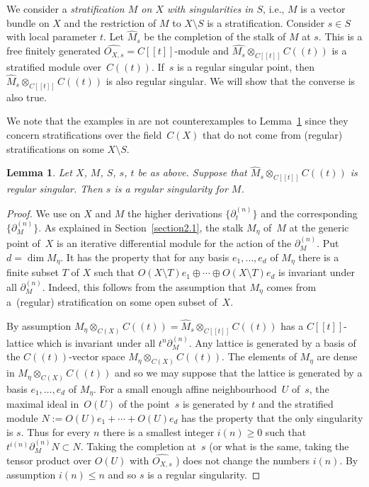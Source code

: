 \documentclass[10pt,a4paper]{amsart}
\numberwithin{equation}{section}
\newtheorem{Lemma}[Theorem]{Lemma}
\begin{document}
We consider a {\it stratification $M$ on $X$ with singularities in $S$}, i.e., $M$ is a vector bundle on $X$ and the restriction of $M$ to $X\setminus S$ is a stratification. Consider $s\in S$ with local parameter $t$. Let $\widehat{M}_s$ be the completion of the stalk of $M$ at $s$. This is a free finitely generated $\widehat{O_{X,s}}=C[[t]]$-module and $\widehat{M_s}\otimes _{C[[t]]}C((t))$ is a stratified module over~$C((t))$. If~$s$ is a regular singular point, then $\widehat{M}_s\otimes_{C[[t]]} C((t))$ is also regular singular. We will show that the converse is also true.

We note that the examples in \cite[Sections~4.2 and~7]{Ma-vdP1} are not counterexamples to Lemma~\ref{3.1} since they concern stratifications over the field~$C(X)$ that do not come from (regular) stratifications on some $X\setminus S$.

\begin{Lemma}\label{3.1} Let $X$, $M$, $S$, $s$, $t$ be as above. Suppose that $\widehat{M}_s\otimes _{C[[t]]}C((t))$ is regular singular. Then $s$ is a regular singularity for $M$.
 \end{Lemma}
\begin{proof} We use on $X$ and $M$ the higher derivations $\big\{\partial_t^{(n)}\big\}$ and the corresponding $\big\{\partial_M^{(n)}\big\}$. As explained in Section~\ref{section2.1}, the stalk $M_\eta$ of~$M$ at the generic point of~$X$ is an iterative differential module for the action of the $\partial_M^{(n)}$. Put $d=\dim M_\eta$. It has the property that for any basis $e_1,\dots ,e_d$ of $M_\eta$ there is a finite subset $T$ of $X$ such that $O(X\setminus T)e_1\oplus \cdots \oplus O(X\setminus T)e_d$ is invariant under all $\partial_M^{(n)}$. Indeed, this follows from the assumption that $M_\eta$ comes from a~(regular) stratification on some open subset of~$X$.

By assumption $M_\eta\otimes _{C(X)}C((t))=\widehat{M}_s\otimes _{C[[t]]}C((t))$ has a $C[[t]]$-lattice which is invariant under all $t^n\partial_M^{(n)}$. Any lattice is generated by a basis of the $C((t))$-vector space $M_\eta\otimes _{C(X)}C((t))$. The elements of $M_\eta$ are dense in $M_\eta\otimes _{C(X)}C((t))$ and so we may suppose that the lattice is generated by a basis $e_1,\dots ,e_d$ of $M_\eta$. For a small enough affine neighbourhood~$U$ of~$s$, the maximal ideal in~$O(U)$ of the point~$s$ is generated by $t$ and the stratified module $N:=O(U)e_1+\cdots +O(U)e_d$ has the property that the only singularity is $s$. Thus for every $n$ there is a smallest integer $i(n)\geq 0$ such that $t^{i(n)}\partial _M^{(n)}N\subset N$. Taking the completion at~$s$ (or what is the same, taking the tensor product over $O(U)$ with $\widehat{O_{X,s}}$ ) does not change the numbers $i(n)$. By assumption $i(n)\leq n$ and so $s$ is a regular singularity. \end{proof}
\end{document}
